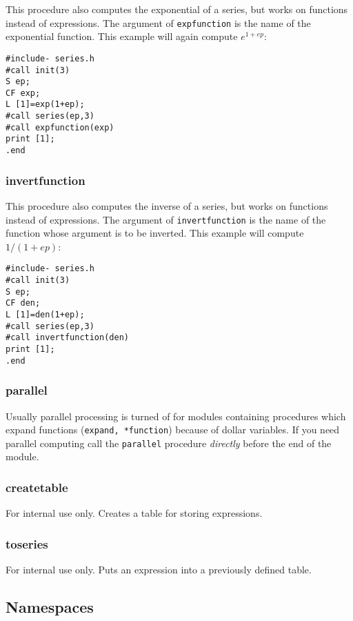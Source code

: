 \documentclass{article}
\begin{document}
This procedure also computes the exponential of a series, but works on
functions instead of expressions. The argument of {\tt expfunction} is
the name of the exponential function. This example will again compute $e^{1+ep}$:
\begin{verbatim}
#include- series.h
#call init(3)
S ep;
CF exp;
L [1]=exp(1+ep);
#call series(ep,3)
#call expfunction(exp)
print [1];
.end
\end{verbatim}

\subsubsection{invertfunction}
\label{sec:inv_fun}

This procedure also computes the inverse of a series, but works on
functions instead of expressions. The argument of {\tt invertfunction} is
the name of the function whose argument is to be inverted. This example will compute $1/(1+ep)$:
\begin{verbatim}
#include- series.h
#call init(3)
S ep;
CF den;
L [1]=den(1+ep);
#call series(ep,3)
#call invertfunction(den)
print [1];
.end
\end{verbatim}

\subsubsection{parallel}
\label{sec:parallel}

Usually parallel processing is turned of for modules containing
procedures which expand functions ({\tt expand, *function}) because of
dollar variables. If you need
parallel computing call the {\tt parallel} procedure {\em directly}
  before the end of the module.

\subsubsection{createtable}
\label{sec:createtable}

For internal use only. Creates a table for storing expressions.

\subsubsection{toseries}
\label{sec:toseries}

For internal use only. Puts an expression into a previously defined table.

\subsection{Namespaces}
\label{sec:namesp}
\end{document}
